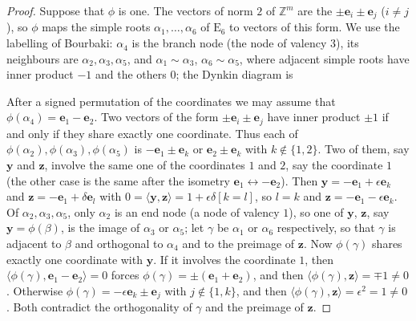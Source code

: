 \documentclass[11pt]{article}
\newcommand\ints{{\mathbb Z}}
\newcommand\Zy{{\mathbf y}}
\newcommand\Zz{{\mathbf z}}
\newcommand\ip[2]{\langle#1,#2\rangle}
\theoremstyle{definition}
\newcommand{\typ}[1]{\mathrm{#1}}
\newcommand\Ze{{\mathbf e}}
\begin{document}
\begin{proof}
Suppose that $\phi$ is one. The vectors of norm $2$ of $\ints^m$ are the $\pm\Ze_i\pm\Ze_j$
($i\ne j$), so $\phi$ maps the simple roots $\alpha_1,\dots,\alpha_6$ of $\typ E_6$ to vectors
of this form. We use the labelling of Bourbaki: $\alpha_4$ is the branch node (the node of valency $3$), its neighbours
are $\alpha_2,\alpha_3,\alpha_5$, and $\alpha_1\sim\alpha_3$, $\alpha_6\sim\alpha_5$, where
adjacent simple roots have inner product $-1$ and the others $0$; the Dynkin diagram is
\begin{center}
\end{center}
After a signed permutation of the coordinates we may assume that $\phi(\alpha_4)=\Ze_1-\Ze_2$.
Two vectors of the form $\pm\Ze_i\pm\Ze_j$ have inner product $\pm1$ if and only if they share
exactly one coordinate. Thus each of $\phi(\alpha_2),\phi(\alpha_3),\phi(\alpha_5)$ is
$-\Ze_1\pm\Ze_k$ or $\Ze_2\pm\Ze_k$ with $k\notin\{1,2\}$. Two of them, say $\Zy$ and $\Zz$,
involve the same one of the coordinates $1$ and $2$, say the coordinate $1$ (the other case is
the same after the isometry $\Ze_1\leftrightarrow-\Ze_2$). Then $\Zy=-\Ze_1+\epsilon\Ze_k$ and
$\Zz=-\Ze_1+\delta\Ze_l$ with $0=\ip{\Zy}{\Zz}=1+\epsilon\delta[k=l]$, so $l=k$ and
$\Zz=-\Ze_1-\epsilon\Ze_k$. Of $\alpha_2,\alpha_3,\alpha_5$, only $\alpha_2$ is an end node (a node of valency $1$), so
one of $\Zy$, $\Zz$, say $\Zy=\phi(\beta)$, is the image of $\alpha_3$ or $\alpha_5$; let
$\gamma$ be $\alpha_1$ or $\alpha_6$ respectively, so that $\gamma$ is adjacent to $\beta$ and
orthogonal to $\alpha_4$ and to the preimage of $\Zz$. Now $\phi(\gamma)$ shares exactly one
coordinate with $\Zy$. If it involves the coordinate $1$, then $\ip{\phi(\gamma)}{\Ze_1-\Ze_2}=0$
forces $\phi(\gamma)=\pm(\Ze_1+\Ze_2)$, and then $\ip{\phi(\gamma)}{\Zz}=\mp1\ne0$. Otherwise
$\phi(\gamma)=-\epsilon\Ze_k\pm\Ze_j$ with $j\notin\{1,k\}$, and then
$\ip{\phi(\gamma)}{\Zz}=\epsilon^2=1\ne0$. Both contradict the orthogonality of $\gamma$ and
the preimage of $\Zz$.
\end{proof}
\end{document}
